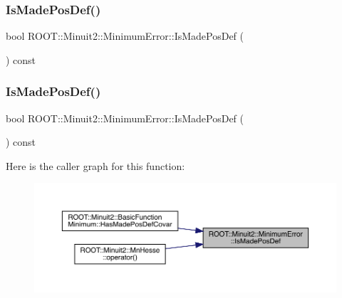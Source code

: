\subsubsection{\texorpdfstring{IsMadePosDef()}{IsMadePosDef()}\hspace{0.1cm}{\footnotesize\ttfamily [1/3]}}
{\footnotesize\ttfamily bool R\+O\+O\+T\+::\+Minuit2\+::\+Minimum\+Error\+::\+Is\+Made\+Pos\+Def (\begin{DoxyParamCaption}{ }\end{DoxyParamCaption}) const\hspace{0.3cm}{\ttfamily [inline]}}

\mbox{\label{classROOT_1_1Minuit2_1_1MinimumError_addbc60edad85c271c20be5ff18678599}} 
\subsubsection{\texorpdfstring{IsMadePosDef()}{IsMadePosDef()}\hspace{0.1cm}{\footnotesize\ttfamily [2/3]}}
{\footnotesize\ttfamily bool R\+O\+O\+T\+::\+Minuit2\+::\+Minimum\+Error\+::\+Is\+Made\+Pos\+Def (\begin{DoxyParamCaption}{ }\end{DoxyParamCaption}) const\hspace{0.3cm}{\ttfamily [inline]}}

Here is the caller graph for this function\+:
\nopagebreak
\begin{figure}[H]
\begin{center}
\leavevmode
\includegraphics[width=350pt]{d5/d32/classROOT_1_1Minuit2_1_1MinimumError_addbc60edad85c271c20be5ff18678599_icgraph}
\end{center}
\end{figure}
\mbox{\label{classROOT_1_1Minuit2_1_1MinimumError_addbc60edad85c271c20be5ff18678599}} 
